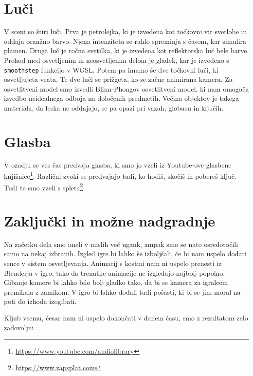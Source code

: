 \documentclass[a4paper,12pt]{article}
\begin{document}
\newpage

\section{Luči}
V sceni so štiri luči. Prva je petrolejka, ki je izvedena kot točkovni vir svetlobe in oddaja oranžno barvo. Njena intenziteta se rahlo spreminja s časom, kar simulira plamen. Druga luč je ročna svetilka, ki je izvedena kot reflektorska luč bele barve. Prehod med osvetljenim in neosvetljenim delom je gladek, kar je izvedeno s \verb+smoothstep+ funkcijo v WGSL. Potem pa imamo še dve točkovni luči, ki osvetljujeta vrata. Te dve luči se prižgeta, ko se začne animirana kamera.
Za osvetlitveni model smo izvedli Blinn-Phongov osvetlitveni model, ki nam omogoča izvedbo neidealnega odboja na določenih predmetih. Večina objektov je takega materiala, da leska ne oddajajo, se pa opazi pri vazah, globusu in ključih.

\section{Glasba}
V ozadju se ves čas predvaja glasba, ki smo jo vzeli iz Youtube-ove glasbene knjižnice\footnote{\url{https://www.youtube.com/audiolibrary}}. Različni zvoki se predvajajo tudi, ko hodiš, skočiš in pobereš ključ. Tudi te smo vzeli s spleta\footnote{\url{https://www.zapsplat.com}}.

\section{Zaključki in možne nadgradnje}
Na začetku dela smo imeli v mislih več ugank, ampak smo se nato osredotočili samo na nekaj izbranih. Izgled igre bi lahko še izboljšali, če bi nam uspelo dodati sence v sistem osvetljevanja. Animacij s kostmi nam ni uspelo prenesti iz Blenderja v igro, tako da trenutne animacije ne izgledajo najbolj popolno. Gibanje kamere bi lahko bilo bolj gladko tako, da bi se kamera za igralcem premikala z zamikom. V igro bi lahko dodali tudi pošasti, ki bi se jim moral na poti do izhoda izogibati.

Kljub vsemu, česar nam ni uspelo dokončati v danem času, smo z rezultatom zelo zadovoljni.
\end{document}
